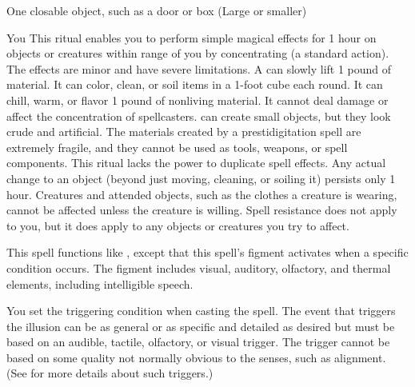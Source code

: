 \begin{spelltarget}{One closable object, such as a door or box (Large or smaller)}
\begin{spelltarget}{You}
\spelleffect This ritual enables you to perform simple magical effects for 1 hour on objects or creatures within \rngclose range of you by concentrating (a standard action). The effects are minor and have severe limitations. A  can slowly lift 1 pound of material. It can color, clean, or soil items in a 1-foot cube each round. It can chill, warm, or flavor 1 pound of nonliving material. It cannot deal damage or affect the concentration of spellcasters.  can create small objects, but they look crude and artificial. The materials created by a prestidigitation spell are extremely fragile, and they cannot be used as tools, weapons, or spell components.
\spellnotes This ritual lacks the power to duplicate spell effects. Any actual change to an object (beyond just moving, cleaning, or soiling it) persists only 1 hour. Creatures and attended objects, such as the clothes a creature is wearing, cannot be affected unless the creature is willing. Spell resistance does not apply to you, but it does apply to any objects or creatures you try to affect.

\spelleffect This spell functions like , except that this spell's figment activates when a specific condition occurs. The figment includes visual, auditory, olfactory, and thermal elements, including intelligible speech.

You set the triggering condition when casting the spell. The event that triggers the illusion can be as general or as specific and detailed as desired but must be based on an audible, tactile, olfactory, or visual trigger. The trigger cannot be based on some quality not normally obvious to the senses, such as alignment. (See  for more details about such triggers.)


\end{spelltarget}
\end{spelltarget}
